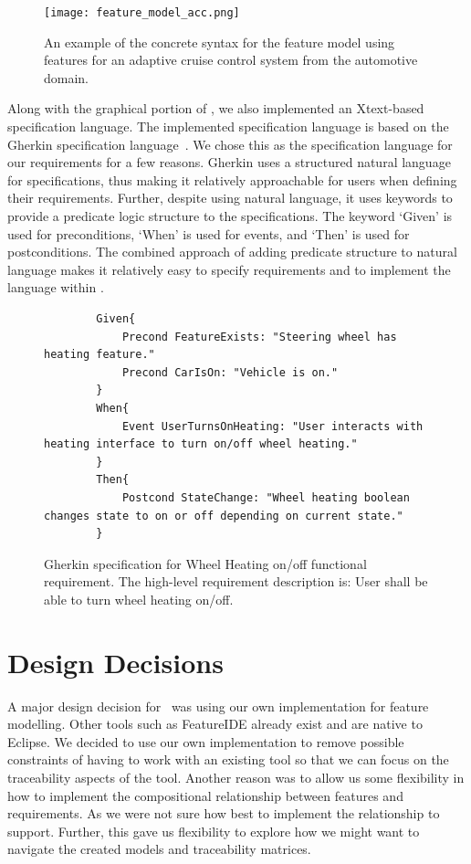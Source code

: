 \begin{figure}[hbt!]
	\centering
	\texttt{[image: feature\_model\_acc.png]}
	\caption{An example of the concrete syntax for the feature model using features for an adaptive cruise control system from the automotive domain.}
	\label{fig:concrete_syntax_feat_mod}
\end{figure}

Along with the graphical portion of \tool, we also implemented an Xtext-based~\cite{eysholdt2010xtext} specification language. The implemented specification language is based on the Gherkin specification language~\cite{nicieja2017writing, cucumberdocs}. We chose this as the specification language for our requirements for a few reasons. Gherkin uses a structured natural language for specifications, thus making it relatively approachable for users when defining their requirements. Further, despite using natural language, it uses keywords to provide a predicate logic structure to the specifications. The keyword `Given' is used for preconditions, `When' is used for events, and `Then' is used for postconditions. The combined approach of adding predicate structure to natural language makes it relatively easy to specify requirements and to implement the language within \tool. 

\begin{figure}
	\begin{lstlisting}
		Given{
			Precond FeatureExists: "Steering wheel has heating feature."
			Precond CarIsOn: "Vehicle is on."
		}
		When{
			Event UserTurnsOnHeating: "User interacts with heating interface to turn on/off wheel heating."
		}
		Then{
			Postcond StateChange: "Wheel heating boolean changes state to on or off depending on current state."
		}
	\end{lstlisting}
	\caption{Gherkin specification for Wheel Heating on/off functional requirement. The high-level requirement description is: User shall be able to turn wheel heating on/off.}
	\label{fig:specification}
\end{figure}

\section{Design Decisions}

A major design decision for \tool\ was using our own implementation for feature modelling. Other tools such as FeatureIDE already exist and are native to Eclipse. We decided to use our own implementation to remove possible constraints of having to work with an existing tool so that we can focus on the traceability aspects of the tool. Another reason was to allow us some flexibility in how to implement the compositional relationship between features and requirements. As we were not sure how best to implement the relationship to support. Further, this gave us flexibility to explore how we might want to navigate the created models and traceability matrices. 

